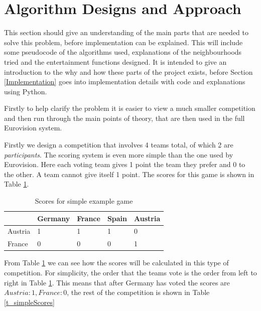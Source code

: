 \documentclass[12pt]{report}
\begin{document}
\section{Algorithm Designs and Approach}\label{AlgorithmDesigns}
This section should give an understanding of the main parts that are needed to solve this problem, before implementation can be explained. This will include some pseudocode of the algorithms used, explanations of the neighbourhoods tried and the entertainment functions designed. It is intended to give an introduction to the why and how these parts of the project exists, before Section \ref{Implementation} goes into implementation details with code and explanations using Python.

Firstly to help clarify the problem it is easier to view a much smaller competition and then run through the main points of theory, that are then used in the full Eurovision system.

Firstly we design a competition that involves 4 teams total, of which 2 are \textit{participants}. The scoring system is even more simple than the one used by Eurovision. Here each voting team gives 1 point the team they prefer and 0 to the other. A team cannot give itself 1 point. The scores for this game is shown in Table \ref{t_simpleMatrix}.

\begin{table}[H]
\centering
\caption{Scores for simple example game}
\label{t_simpleMatrix}
\begin{tabular}{|l|l|l|l|l|}
\hline
        & Germany & France & Spain & Austria \\ \hline
Austria & 1       & 1     & 1      & 0       \\ \hline
France  & 0       & 0     & 0      & 1       \\ \hline
\end{tabular}
\end{table}

From Table \ref{t_simpleMatrix} we can see how the scores will be calculated in this type of competition. For simplicity, the order that the teams vote is the order from left to right in Table \ref{t_simpleMatrix}. This means that after Germany has voted the scores are $Austria: 1, France: 0$, the rest of the competition is shown in Table \ref{t_simpleScores}
\end{document}
